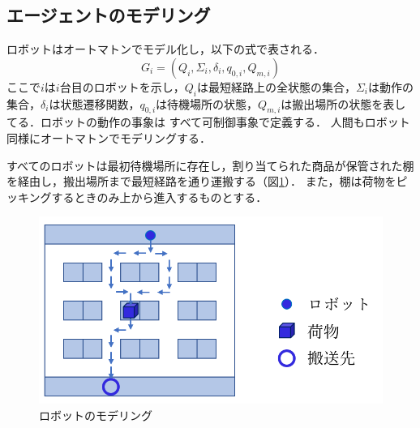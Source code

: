 
\subsection{エージェントのモデリング}
ロボットはオートマトンでモデル化し，以下の式で表される．
\begin{equation}
    G_i=(Q_i,\Sigma_i,\delta_i,q_{0,i},Q_{m,i})
\end{equation}
ここで$i$は$i$台目のロボットを示し，$Q_i$は最短経路上の全状態の集合，$\Sigma_i$は動作の集合，$\delta_i$は状態遷移関数，$q_{0,i}$は待機場所の状態，$Q_{m,i}$は搬出場所の状態を表してる．ロボットの動作の事象は
すべて可制御事象で定義する．
人間もロボット同様にオートマトンでモデリングする．

すべてのロボットは最初待機場所に存在し，割り当てられた商品が保管された棚を経由し，搬出場所まで最短経路を通り運搬する（図\ref{fig:robot_example}）．
また，棚は荷物をピッキングするときのみ上から進入するものとする．

\begin{figure}[h]
    \centering
    \includegraphics[scale=0.38]{figures/robot_example.pdf}
    \caption{ロボットのモデリング}
    \label{fig:robot_example}
\end{figure}

